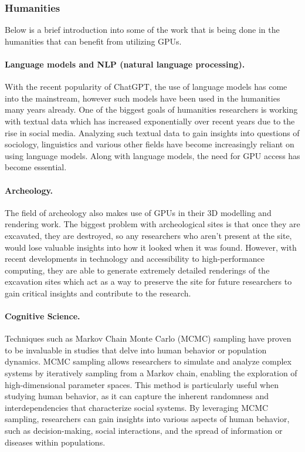 \subsubsection{Humanities}


\par
Below is a brief introduction into some of the work that is being done in the humanities that can benefit from utilizing GPUs.


\paragraph{Language models and NLP (natural language processing).}
With the recent popularity of ChatGPT, the use of language models has come into the mainstream, however such models have been used in the humanities many years already.
One of the biggest goals of humanities researchers is working with textual data which has increased exponentially over recent years due to the rise in social media.
Analyzing such textual data to gain insights into questions of sociology, linguistics and various other fields have become increasingly reliant on using language models.
Along with language models, the need for GPU access has become essential.


\paragraph{Archeology.}
The field of archeology also makes use of GPUs in their 3D modelling and rendering work.
The biggest problem with archeological sites is that once they are excavated, they are destroyed, so any researchers who aren’t present at the site, would lose valuable insights into how it looked when it was found.
However, with recent developments in technology and accessibility to high-performance computing, they are able to generate extremely detailed renderings of the excavation sites which act as a way to preserve the site for future researchers to gain critical insights and contribute to the research.


\paragraph{Cognitive Science.}
Techniques such as Markov Chain Monte Carlo (MCMC) sampling have proven to be invaluable in studies that delve into human behavior or population dynamics.
MCMC sampling allows researchers to simulate and analyze complex systems by iteratively sampling from a Markov chain, enabling the exploration of high-dimensional parameter spaces.
This method is particularly useful when studying human behavior, as it can capture the inherent randomness and interdependencies that characterize social systems.
By leveraging MCMC sampling, researchers can gain insights into various aspects of human behavior, such as decision-making, social interactions, and the spread of information or diseases within populations.


